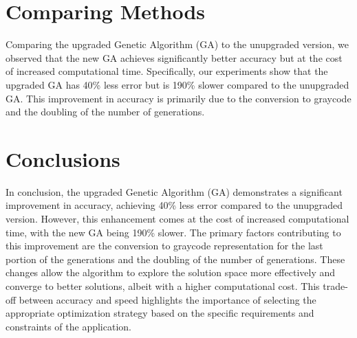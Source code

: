 \documentclass{article}
\begin{document}
\section{Comparing Methods}
Comparing the upgraded Genetic Algorithm (GA) to the unupgraded version, we observed that the new GA achieves significantly better accuracy but at the cost of increased computational time. Specifically, our experiments show that the upgraded GA has 40\% less error but is 190\% slower compared to the unupgraded GA. This improvement in accuracy is primarily due to the conversion to graycode and the doubling of the number of generations.

\section{Conclusions}
In conclusion, the upgraded Genetic Algorithm (GA) demonstrates a significant improvement in accuracy, achieving 40\% less error compared to the unupgraded version. However, this enhancement comes at the cost of increased computational time, with the new GA being 190\% slower. The primary factors contributing to this improvement are the conversion to graycode representation for the last portion of the generations and the doubling of the number of generations. These changes allow the algorithm to explore the solution space more effectively and converge to better solutions, albeit with a higher computational cost. This trade-off between accuracy and speed highlights the importance of selecting the appropriate optimization strategy based on the specific requirements and constraints of the application.
\end{document}
